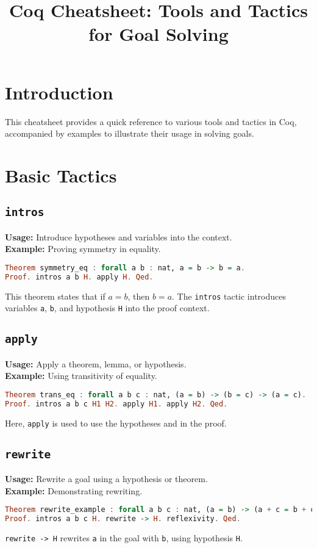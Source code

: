 \documentclass{article}
\begin{document}
\title{Coq Cheatsheet: Tools and Tactics for Goal Solving}

\section{Introduction}
This cheatsheet provides a quick reference to various tools and tactics in Coq, accompanied by examples to illustrate their usage in solving goals.

\section{Basic Tactics}
\subsection{\texttt{intros}}
\textbf{Usage:} Introduce hypotheses and variables into the context. \\
\textbf{Example:} Proving symmetry in equality.
\begin{lstlisting}[language=haskell]
Theorem symmetry_eq : forall a b : nat, a = b -> b = a.
Proof. intros a b H. apply H. Qed.
\end{lstlisting}
This theorem states that if \( a = b \), then \( b = a \). The \texttt{intros} tactic introduces variables \texttt{a}, \texttt{b}, and hypothesis \texttt{H} into the proof context.

\subsection{\texttt{apply}}
\textbf{Usage:} Apply a theorem, lemma, or hypothesis. \\
\textbf{Example:} Using transitivity of equality.
\begin{lstlisting}[language=haskell]
Theorem trans_eq : forall a b c : nat, (a = b) -> (b = c) -> (a = c).
Proof. intros a b c H1 H2. apply H1. apply H2. Qed.
\end{lstlisting}
Here, \texttt{apply} is used to use the hypotheses  and  in the proof.

\subsection{\texttt{rewrite}}
\textbf{Usage:} Rewrite a goal using a hypothesis or theorem. \\
\textbf{Example:} Demonstrating rewriting.
\begin{lstlisting}[language=haskell]
Theorem rewrite_example : forall a b c : nat, (a = b) -> (a + c = b + c).
Proof. intros a b c H. rewrite -> H. reflexivity. Qed.
\end{lstlisting}
\texttt{rewrite -> H} rewrites \texttt{a} in the goal with \texttt{b}, using hypothesis \texttt{H}.
\end{document}
